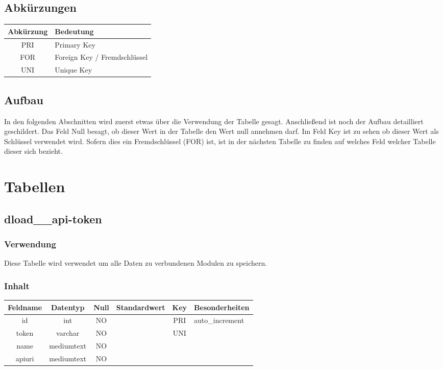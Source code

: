 \subsection{Abkürzungen}
\begin{table}[H]
	\begin{tabular}{|c|p{12cm}|}
		\hline
		\textbf{Abkürzung} & \textbf{Bedeutung} \\ \hline
		PRI & Primary Key \\ \hline
		FOR & Foreign Key / Fremdschlüssel \\ \hline
		UNI & Unique Key \\ \hline
	\end{tabular}
\end{table}
\subsection{Aufbau}
In den folgenden Abschnitten wird zuerst etwas über die Verwendung der Tabelle gesagt. Anschließend ist noch der Aufbau detailliert geschildert. Das Feld {\glqq Null\grqq} besagt, ob dieser Wert in der Tabelle den Wert {\glqq null\grqq} annehmen darf. Im Feld {\glqq Key\grqq} ist zu sehen ob dieser Wert als Schlüssel verwendet wird. Sofern dies ein Fremdschlüssel ({\glqq FOR\grqq}) ist, ist in der nächsten Tabelle zu finden auf welches Feld welcher Tabelle dieser sich bezieht.
\section{Tabellen}
\subsection{dload\_\_api-token}
\subsubsection{Verwendung} Diese Tabelle wird verwendet um alle Daten zu verbundenen Modulen zu speichern.
\subsubsection{Inhalt}
\begin{table}[H]
	\begin{tabular}{|c|c|c|c|c|p{3.5cm}|}
		\hline
		\textbf{Feldname} & \textbf{Datentyp} & \textbf{Null} & \textbf{Standardwert} & \textbf{Key}   & \textbf{Besonderheiten} \\ \hline
		id & int & NO &  & PRI & auto\_increment \\ \hline
		token & varchar & NO &  & UNI & \\ \hline
		name & mediumtext & NO &  &  & \\ \hline
		apiuri & mediumtext & NO &  &  & \\ \hline
	\end{tabular}
\end{table}
